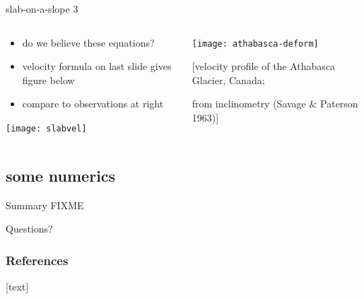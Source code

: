 \documentclass[10pt,dvipsnames]{beamer}
\begin{document}
\begin{frame}{slab-on-a-slope 3}

\begin{columns}
\begin{column}{0.6\textwidth}
\begin{itemize}
\item do we believe these equations?
\item velocity formula on last slide gives figure below
\item compare to observations at right
\end{itemize}
\begin{center}
\texttt{[image: slabvel]}
\end{center}
\end{column}

\begin{column}{0.4\textwidth}
\texttt{[image: athabasca-deform]}

\medskip
\tiny [velocity profile of the Athabasca Glacier, Canada;

from inclinometry (Savage \& Paterson 1963)]
\end{column}
\end{columns}
\end{frame}


\subsection{some numerics}

\begin{frame}{Summary}
FIXME
\end{frame}

\begin{frame}[standout]
  Questions?
\end{frame}


\appendix



\begin{frame}[allowframebreaks]
\frametitle{References}
[text]

  
  
\end{frame}
\end{document}
